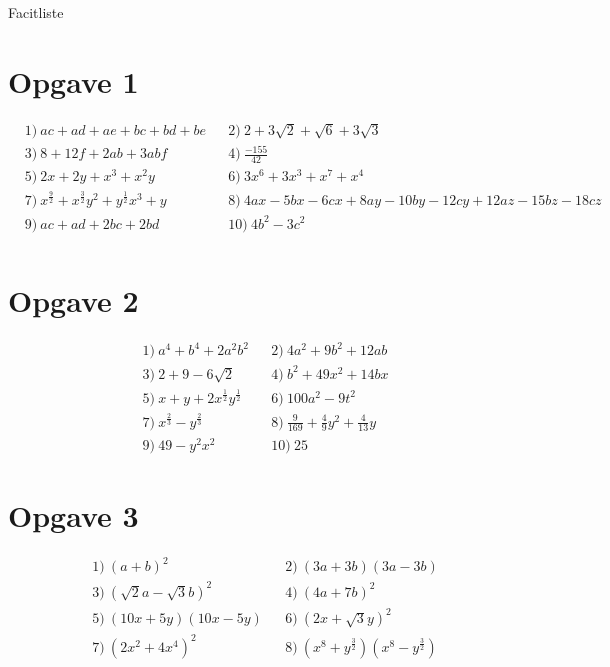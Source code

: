 
\begin{center}
\Huge
Facitliste
\end{center}
\section*{Opgave 1}

\begin{align*}
&1) \ ac+ad+ae+bc+bd+be   &&2) \ 2+3\sqrt{2}+\sqrt{6} + 3\sqrt{3}    \\
&3) \ 8+12f+2ab+3abf  &&4) \ \frac{-155}{42}   \\
&5) \  2x+2y+x^3+x^2y  &&6) \ 3x^6+3x^3+x^7+x^4   \\
&7) \  x^{\frac{9}{2}}+x^{\frac{3}{2}}y^2+y^{\frac{1}{2}}x^3+y &&8) \ 4ax-5bx-6cx+8ay-10by-12cy+12az-15bz-18cz    \\
&9) \ ac+ad+2bc+2bd   &&10) \ 4b^2-3c^2    \\
\end{align*}
\section*{Opgave 2}
\begin{align*}
&1) \ a^4+b^4+2a^2b^2  && 2) \ 4a^2+9b^2+12ab   \\
&3) \ 2+9-6\sqrt{2}  && 4) \ b^2+49x^2+14bx   \\
&5) \ x+y+2x^{\frac{1}{2}}y^{\frac{1}{2}}  && 6) \ 100a^2-9t^2  \\
&7) \ x^{\frac{2}{3}} - y^{\frac{2}{3}}  && 8) \ \frac{9}{169} +\frac{4}{9}y^2+\frac{4}{13}y   \\
&9) \ 49-y^2x^2  && 10) \ 25   
\end{align*}

\section*{Opgave 3}
\begin{align*}
&1) \  (a+b)^2  &&2) \ (3a+3b)(3a-3b)    \\
&3) \ (\sqrt{2}a-\sqrt{3}b)^2  &&4) \ (4a+7b)^2    \\
&5) \ (10x+5y)(10x-5y)  &&6) \  (2x+\sqrt{3}y)^2    \\
&7) \ (2x^2+4x^4)^2  &&8) \ (x^8+y^{\frac{3}{2}})(x^8-y^{\frac{3}{2}})   \\
\end{align*}